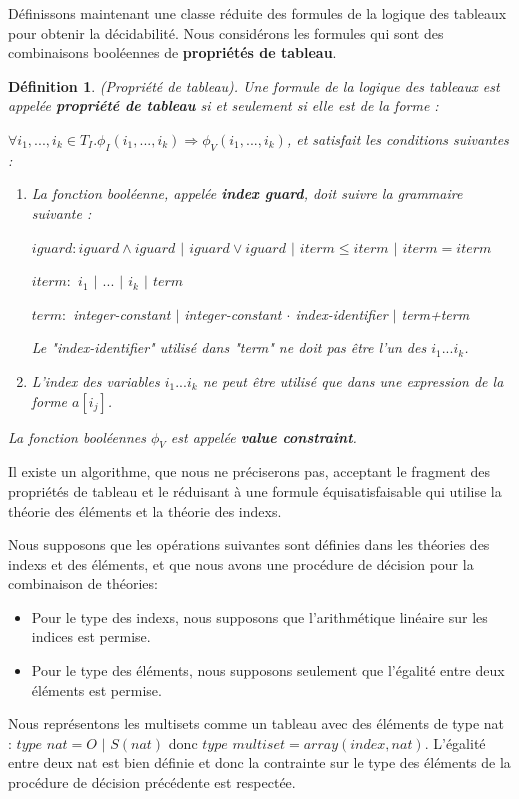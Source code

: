 \documentclass[11pt,openany]{article}
\newtheorem{definition}{D\'efinition}[subsection]
\begin{document}
	D\'efinissons maintenant une classe r\'eduite des formules de la logique des tableaux pour obtenir la d\'ecidabilit\'e. Nous consid\'erons les formules qui sont des combinaisons bool\'eennes de \textbf{propri\'et\'es de tableau}.
	
	\begin{definition}
		(Propri\'et\'e de tableau). Une formule de la logique des tableaux est appel\'ee \textbf{propri\'et\'e de tableau} si et seulement si elle est de la forme :\par
$\forall i_{1},...,i_{k}\in T_{I}.\phi_{I}(i_{1},...,i_{k})\Longrightarrow\phi_{V}(i_{1},...,i_{k})$, et satisfait les conditions suivantes :
\begin{enumerate}
\item La fonction bool\'eenne, appel\'ee \textbf{index guard}, doit suivre la grammaire suivante :\par
$iguard : iguard\land iguard$ $|$ $iguard\lor iguard$ $|$ $iterm\leq iterm$ $|$ $iterm = iterm$\par
$iterm :$ $i_{1}$ $|$ $...$ $|$ $i_{k}$ $|$ $term$\par
$term :$ integer-constant $|$ integer-constant $\cdot$ index-identifier $|$ term+term\par
Le "index-identifier" utilis\'e dans "term" ne doit pas \^etre l'un des $i_{1}...i_{k}$.
\item L'index des variables $i_{1}...i_{k}$ ne peut \^etre utilis\'e que dans une expression de la forme $a[i_{j}]$.
\end{enumerate}\par
La fonction bool\'eennes $\phi_{V}$ est appel\'ee \textbf{value constraint}.
	\end{definition}
	Il existe un algorithme, que nous ne pr\'eciserons pas, acceptant le fragment des propri\'et\'es de tableau et le r\'eduisant \`a une formule \'equisatisfaisable qui utilise la th\'eorie des \'el\'ements et la th\'eorie des indexs.\par
	Nous supposons que les op\'erations suivantes sont d\'efinies dans les th\'eories des indexs et des \'el\'ements, et que nous avons une proc\'edure de d\'ecision pour la combinaison de th\'eories: 
	\begin{itemize}
	\item Pour le type des indexs, nous supposons que l'arithm\'etique lin\'eaire sur les indices est permise.
	\item Pour le type des \'el\'ements, nous supposons seulement que l'\'egalit\'e entre deux \'el\'ements est permise.
	\end{itemize}
\par
 		Nous repr\'esentons les multisets comme un tableau avec des \'el\'ements de type nat : $ type$ $nat = O$ $|$ $S(nat)$ donc $type$ $multiset = array(index,nat)$. L'\'egalit\'e entre deux nat est bien d\'efinie et donc la contrainte sur le type des \'el\'ements de la proc\'edure de d\'ecision pr\'ec\'edente est respect\'ee.
\end{document}
